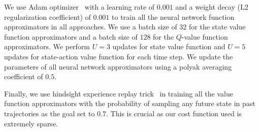 We use Adam optimizer~\cite{DBLP:journals/corr/KingmaB14} with a
learning rate of $0.001$ and a weight decay (L$2$ regularization
coefficient) of $0.001$ to train all the neural network function
approximators in all approaches. We use a batch size of $32$ for the
state value function approximators and a batch size of $128$ for the
$Q$-value function approximators. We perform $U = 3$ updates for state
value function and $U = 5$ updates for state-action value function for
each time step. We update the parameters of all neural network
approximators using a polyak averaging coefficient of $0.5$.


Finally, we use hindsight experience replay
trick~\cite{DBLP:conf/nips/AndrychowiczCRS17} in training all the
value function approximators with the probability of sampling any
future state in past trajectories as the goal set to $0.7$. This is
crucial as our cost function used is extremely sparse.

